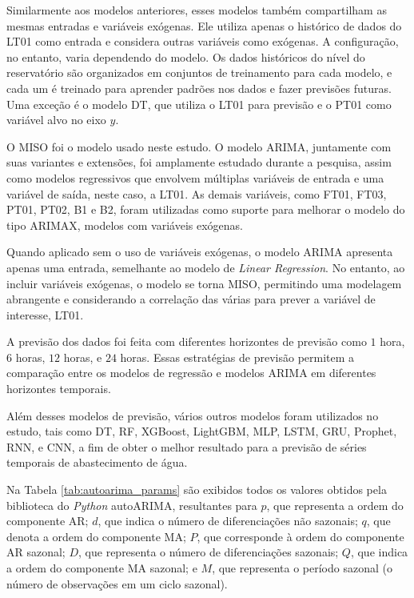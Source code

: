 Similarmente aos modelos anteriores, esses modelos também compartilham as mesmas entradas e variáveis exógenas. Ele utiliza apenas o histórico de dados do LT01 como entrada e considera outras variáveis como exógenas. A configuração, no entanto, varia dependendo do modelo. Os dados históricos do nível do reservatório são organizados em conjuntos de treinamento para cada modelo, e cada um é treinado para aprender padrões nos dados e fazer previsões futuras. Uma exceção é o modelo DT, que utiliza o LT01 para previsão e o PT01 como variável alvo no eixo $y$.


O MISO foi o modelo usado neste estudo. O modelo ARIMA, juntamente com suas variantes e extensões, foi amplamente estudado durante a pesquisa, assim como modelos regressivos que envolvem múltiplas variáveis de entrada e uma variável de saída, neste caso, a LT01. As demais variáveis, como FT01, FT03, PT01, PT02, B1 e B2, foram utilizadas como suporte para melhorar o modelo do tipo ARIMAX, modelos com variáveis exógenas.

Quando aplicado sem o uso de variáveis exógenas, o modelo ARIMA apresenta apenas uma entrada, semelhante ao modelo de \textit{Linear Regression}. No entanto, ao incluir variáveis exógenas, o modelo se torna MISO, permitindo uma modelagem  abrangente e considerando a correlação das várias para prever a variável de interesse, LT01.

A previsão dos dados foi feita com diferentes horizontes de previsão como $1$ hora, $6$ horas, $12$ horas, e $24$ horas. Essas estratégias de previsão permitem a comparação entre os modelos de regressão e modelos ARIMA em diferentes horizontes temporais.

Além desses modelos de previsão, vários outros modelos foram utilizados no estudo, tais como DT, RF, XGBoost, LightGBM, MLP, LSTM, GRU, Prophet, RNN, e CNN, a fim de obter o melhor resultado para a previsão de séries temporais de abastecimento de água.


Na Tabela \ref{tab:autoarima_params} são exibidos todos os valores obtidos pela biblioteca do \textit{Python} autoARIMA, resultantes para $p$, que representa a ordem do componente AR; $d$, que indica o número de diferenciações não sazonais; $q$, que denota a ordem do componente MA; $P$, que corresponde à ordem do componente AR sazonal; $D$, que representa o número de diferenciações sazonais; $Q$, que indica a ordem do componente MA sazonal; e $M$, que representa o período sazonal (o número de observações em um ciclo sazonal).


